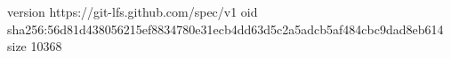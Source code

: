 version https://git-lfs.github.com/spec/v1
oid sha256:56d81d438056215ef8834780e31ecb4dd63d5c2a5adcb5af484cbc9dad8eb614
size 10368
